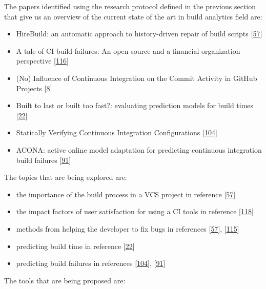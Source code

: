 \documentclass[]{book}
\providecommand{\tightlist}{%
  \setlength{\itemsep}{0pt}\setlength{\parskip}{0pt}}
\begin{document}
The papers identified using the research protocol defined in the
previous section that give us an overview of the current state of the
art in build analytics field are:

\begin{itemize}
\tightlist
\item
  HireBuild: an automatic approach to history-driven repair of build
  scripts {[}\protect\hyperlink{ref-hassan2018hirebuild}{57}{]}
\item
  A tale of CI build failures: An open source and a financial
  organization perspective
  {[}\protect\hyperlink{ref-vassallo2017tale}{116}{]}
\item
  (No) Influence of Continuous Integration on the Commit Activity in
  GitHub Projects {[}\protect\hyperlink{ref-baltes2018no}{8}{]}
\item
  Built to last or built too fast?: evaluating prediction models for
  build times {[}\protect\hyperlink{ref-bisong2017built}{22}{]}
\item
  Statically Verifying Continuous Integration Configurations
  {[}\protect\hyperlink{ref-santolucito2018statically}{104}{]}
\item
  ACONA: active online model adaptation for predicting continuous
  integration build failures
  {[}\protect\hyperlink{ref-ni2018acona}{91}{]}
\end{itemize}

The topics that are being explored are:

\begin{itemize}
\tightlist
\item
  the importance of the build process in a VCS project in reference
  {[}\protect\hyperlink{ref-hassan2018hirebuild}{57}{]}
\item
  the impact factors of user satisfaction for using a CI tools in
  reference {[}\protect\hyperlink{ref-widder2018m}{118}{]}
\item
  methods from helping the developer to fix bugs in references
  {[}\protect\hyperlink{ref-hassan2018hirebuild}{57}{]},
  {[}\protect\hyperlink{ref-vassallo2018break}{115}{]}
\item
  predicting build time in reference
  {[}\protect\hyperlink{ref-bisong2017built}{22}{]}
\item
  predicting build failures in references
  {[}\protect\hyperlink{ref-santolucito2018statically}{104}{]},
  {[}\protect\hyperlink{ref-ni2018acona}{91}{]}
\end{itemize}

The tools that are being proposed are:
\end{document}
